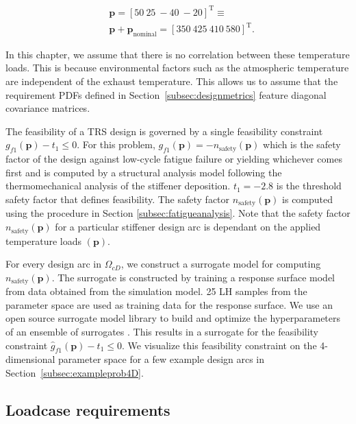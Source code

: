 \begin{equation*}
	\begin{aligned}
		& \mathbf{p} = \left[50 ~ 25 ~ -40 ~ -20\right]^{\mathrm{T}} \equiv \\
		& \mathbf{p} + \mathbf{p}_{\textrm{nominal}} = \left[350 ~ 425 ~ 410 ~ 580\right]^{\mathrm{T}}.
	\end{aligned}
\end{equation*}

In this chapter, we assume that there is no correlation between these temperature loads. This is because environmental factors such as the atmospheric temperature are independent of the exhaust temperature. This allows us to assume that the requirement \acp{PDF} defined in Section~\ref{subsec:designmetrics} feature diagonal covariance matrices.

The feasibility of a \ac{TRS} design is governed by a single feasibility constraint $g_{f1}(\mathbf{p}) - t_1 \le 0$. For this problem, $g_{f1}(\mathbf{p}) = -n_{\textrm{safety}}(\mathbf{p})$ which is the safety factor of the design against low-cycle fatigue failure or yielding whichever comes first and is computed by a structural analysis model following the thermomechanical analysis of the stiffener deposition. $t_1 = -2.8$ is the threshold safety factor that defines feasibility. The safety factor $n_{\textrm{safety}}(\mathbf{p})$ is computed using the procedure in Section \ref{subsec:fatigueanalysis}. Note that the safety factor $n_{\textrm{safety}}(\mathbf{p})$ for a particular stiffener design arc is dependant on the applied temperature loads $(\mathbf{p})$.

For every design arc in $\Omega_{cD}$, we construct a surrogate model for computing $n_{\textrm{safety}}(\mathbf{p})$. The surrogate is constructed by training a response surface model from data obtained from the simulation model. 25 \ac{LH} samples from the parameter space are used as training data for the response surface. We use an open source surrogate model library to build and optimize the hyperparameters of an ensemble of surrogates \cite{Talgorn2018}. This results in a surrogate for the feasibility constraint $\hat{g}_{f1}(\mathbf{p}) - t_1 \le 0$. We visualize this feasibility constraint on the 4-dimensional parameter space for a few example design arcs in Section~\ref{subsec:exampleprob4D}. 

\subsection{Loadcase requirements} \label{subsec:loadcasereq}

